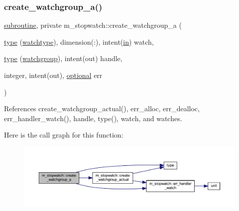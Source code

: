 \subsubsection{\texorpdfstring{create\+\_\+watchgroup\+\_\+a()}{create\_watchgroup\_a()}}
{\footnotesize\ttfamily \hyperlink{M__stopwatch_83_8txt_acfbcff50169d691ff02d4a123ed70482}{subroutine}, private m\+\_\+stopwatch\+::create\+\_\+watchgroup\+\_\+a (\begin{DoxyParamCaption}\item[{\hyperlink{stop__watch_83_8txt_a70f0ead91c32e25323c03265aa302c1c}{type} (\hyperlink{structm__stopwatch_1_1watchtype}{watchtype}), dimension(\+:), intent(\hyperlink{M__journal_83_8txt_afce72651d1eed785a2132bee863b2f38}{in})}]{watch,  }\item[{\hyperlink{stop__watch_83_8txt_a70f0ead91c32e25323c03265aa302c1c}{type} (\hyperlink{structm__stopwatch_1_1watchgroup}{watchgroup}), intent(out)}]{handle,  }\item[{integer, intent(out), \hyperlink{option__stopwatch_83_8txt_aa4ece75e7acf58a4843f70fe18c3ade5}{optional}}]{err }\end{DoxyParamCaption})\hspace{0.3cm}{\ttfamily [private]}}



References create\+\_\+watchgroup\+\_\+actual(), err\+\_\+alloc, err\+\_\+dealloc, err\+\_\+handler\+\_\+watch(), handle, type(), watch, and watches.

Here is the call graph for this function\+:
\nopagebreak
\begin{figure}[H]
\begin{center}
\leavevmode
\includegraphics[width=350pt]{namespacem__stopwatch_a67e6ae5ff7326a3b3f9effc4e4fff281_cgraph}
\end{center}
\end{figure}
\mbox{\label{namespacem__stopwatch_abd31bbf07f8a1571c0ed46f9afc61667}} 
